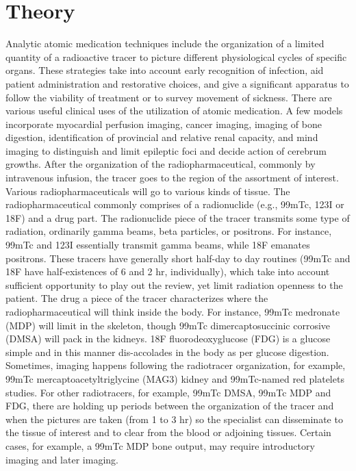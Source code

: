 \documentclass[12pt]{article}
\begin{document}
\section{Theory}
Analytic atomic medication techniques include the organization of a limited quantity of a radioactive tracer to picture different physiological cycles of specific organs. These strategies take into account early recognition of infection, aid patient administration and restorative choices, and give a significant apparatus to follow the viability of treatment or to survey movement of sickness. There are various useful clinical uses of the utilization of atomic medication. A few models incorporate myocardial perfusion imaging, cancer imaging, imaging of bone digestion, identification of provincial and relative renal capacity, and mind imaging to distinguish and limit epileptic foci and decide action of cerebrum growths.
After the organization of the radiopharmaceutical, commonly by intravenous infusion, the tracer goes to the region of the assortment of interest. Various radiopharmaceuticals will go to various kinds of tissue. The radiopharmaceutical commonly comprises of a radionuclide (e.g., 99mTc, 123I or 18F) and a drug part. The radionuclide piece of the tracer transmits some type of radiation, ordinarily gamma beams, beta particles, or positrons. For instance, 99mTc and 123I essentially transmit gamma beams, while 18F emanates positrons. These tracers have generally short half-day to day routines (99mTc and 18F have half-existences of 6 and 2 hr, individually), which take into account sufficient opportunity to play out the review, yet limit radiation openness to the patient. The drug a piece of the tracer characterizes where the radiopharmaceutical will think inside the body. For instance, 99mTc medronate (MDP) will limit in the skeleton, though 99mTc dimercaptosuccinic corrosive (DMSA) will pack in the kidneys. 18F fluorodeoxyglucose (FDG) is a glucose simple and in this manner dis-accolades in the body as per glucose digestion. Sometimes, imaging happens following the radiotracer organization, for example, 99mTc mercaptoacetyltriglycine (MAG3) kidney and 99mTc-named red platelets studies. For other radiotracers, for example, 99mTc DMSA, 99mTc MDP and FDG, there are holding up periods between the organization of the tracer and when the pictures are taken (from 1 to 3 hr) so the specialist can disseminate to the tissue of interest and to clear from the blood or adjoining tissues. Certain cases, for example, a 99mTc MDP bone output, may require introductory imaging and later imaging.
\end{document}
